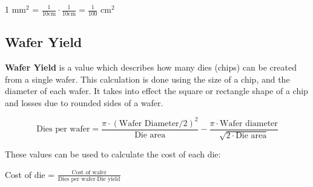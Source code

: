 \documentclass[11pt]{article}
\begin{document}
\begin{center}
    1 mm$^2$ = $\frac{1}{10 \text{cm}} \cdot \frac{1}{10 \text{cm}} = \frac{1}{100}$ cm$^2$
\end{center}

\subsection{Wafer Yield}

\textbf{Wafer Yield} is a value which describes how many dies (chips) can be created from a single wafer. This calculation is done using the size of a chip, and the diameter of each wafer. It takes into effect the square or rectangle shape of a chip and losses due to rounded sides of a wafer.

\begin{center}
\begin{equation} \text{Dies per wafer} = 
    \frac{\pi \cdot (\text{Wafer Diameter}/2)^2}{\text{Die area}} - \frac{\pi \cdot \text{Wafer diameter}}{\sqrt{2 \cdot \text{Die area}}}    
\end{equation}
\end{center}

These values can be used to calculate the cost of each die:

\begin{center}
    Cost of die = $\frac{\text{Cost of wafer}}{\text{Dies per wafer}\cdot\text{Die yield}}$
\end{center}
\end{document}
